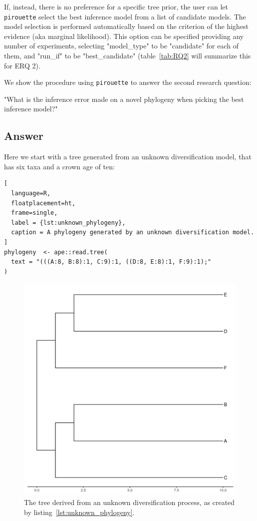 \documentclass{article}
\begin{document}
If, instead, there is no preference for a specific tree prior, the user can let 
\verb;pirouette; select the best inference model from a list of candidate 
models. The model selection is performed automatically based on the criterion 
of the highest evidence (aka marginal likelihood). This option can be specified 
providing any number of experiments, selecting "model\_type" to be "candidate" 
for each of them, and "run\_if" to be "best\_candidate" (table~\ref{tab:RQ2} 
will summarize this for ERQ 2).

We show the procedure using \verb;pirouette; to answer the second research 
question:

"What is the inference error made on a novel phylogeny when
picking the best inference model?"

\subsection{Answer}

Here we start with a tree generated from an unknown 
diversification model, that has six taxa and a crown age of ten:

\begin{lstlisting}[
  language=R, 
  floatplacement=ht, 
  frame=single, 
  label = {lst:unknown_phylogeny},
  caption = A phylogeny generated by an unknown diversification model.
]
phylogeny  <- ape::read.tree(
  text = "(((A:8, B:8):1, C:9):1, ((D:8, E:8):1, F:9):1);"
)
\end{lstlisting}
\begin{figure}[ht]
  \includegraphics[width=\textwidth]{tree_unknown.png}
  \caption{The tree derived from an unknown diversification process, 
    as created by listing~\ref{lst:unknown_phylogeny}.
  }
\end{figure}
\end{document}

